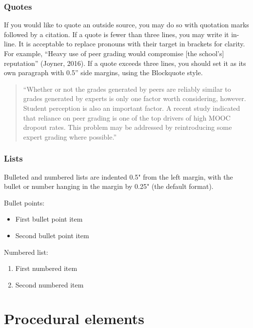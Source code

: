 \documentclass[
	letterpaper, %
]{jdf}
\begin{document}
\subsubsection{Quotes}
If you would like to quote an outside source, you may do so with quotation marks followed by a citation. If a quote is fewer than three lines, you may write it in-line. It is acceptable to replace pronouns with their target in brackets for clarity. For example, “Heavy use of peer grading would compromise [the school’s] reputation” (Joyner, 2016). If a quote exceeds three lines, you should set it as its own paragraph with 0.5” side margins, using the Blockquote style.

\begin{quotation}
	\noindent “Whether or not the grades generated by peers are reliably similar to grades generated by experts is only one factor worth considering, however. Student perception is also an important factor. A recent study indicated that reliance on peer grading is one of the top drivers of high MOOC dropout rates. This problem may be addressed by reintroducing some expert grading where possible.” %
\end{quotation}

\subsubsection{Lists}
Bulleted and numbered lists are indented 0.5" from the left margin, with the bullet or number hanging in the margin by 0.25" (the default format).

Bullet points:

\begin{itemize}
	\item First bullet point item
	\item Second bullet point item
\end{itemize}

Numbered list:

\begin{enumerate}
	\item First numbered item
	\item Second numbered item
\end{enumerate}

\section{Procedural elements}
\end{document}
